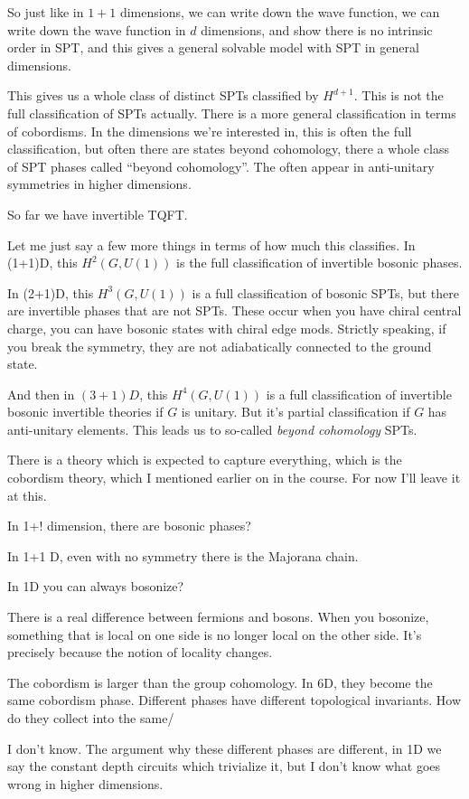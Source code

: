 So just like in $1+1$ dimensions,
we can write down the wave function,
we can write down the wave function in $d$ dimensions,
and show there is no intrinsic order in SPT,
and this gives a general solvable model with SPT in general dimensions.

This gives us a whole class of distinct SPTs classified by $H^{d+1}$.
This is not the full classification of SPTs actually.
There is a more general classification in terms of cobordisms.
In the dimensions we're interested in,
this is often the full classification,
but often there are states beyond cohomology,
there a  whole class of SPT phases called ``beyond cohomology''.
The often appear in anti-unitary symmetries in higher dimensions.

So far we have invertible TQFT.

Let me just say a few more things in terms of how much this classifies.
In (1+1)D,
this $H^2\left( G, U(1) \right)$ is the full classification of invertible
bosonic phases.

In (2+1)D,
this $H^3(G,U(1))$ is a full classification of bosonic SPTs,
but there are invertible phases that are not SPTs.
These occur when you have chiral central charge,
you can have bosonic states with chiral edge mods.
Strictly speaking,
if you break the symmetry,
they are not adiabatically connected to the ground state.

And then in $(3+1)D$,
this $H^4\left( G, U(1) \right)$
is a full classification of invertible bosonic invertible theories if $G$ is
unitary.
But it's partial classification if $G$ has anti-unitary elements.
This leads us to so-called \emph{beyond cohomology} SPTs.

There is a theory which is expected to capture everything,
which is the cobordism theory,
which I mentioned earlier on in the course.
For now I'll leave it at this.


\begin{question}
    In 1+! dimension,
    there are bosonic phases?
\end{question}
In 1+1 D,
even with no symmetry there is the Majorana chain.

\begin{question}
    In 1D you can always bosonize?
\end{question}
There is a real difference between fermions and bosons.
When you bosonize,
something that is local on one side is no longer local on the other side.
It's precisely because the notion of locality changes.

\begin{question}
    The cobordism is larger than the group cohomology.
    In 6D,
    they become the same cobordism phase.
    Different phases have different topological invariants.
    How do they collect into the same/
\end{question}
I don't know.
The argument why these different phases are different,
in 1D we say the constant depth circuits which trivialize it,
but I don't know what goes wrong in higher dimensions.

